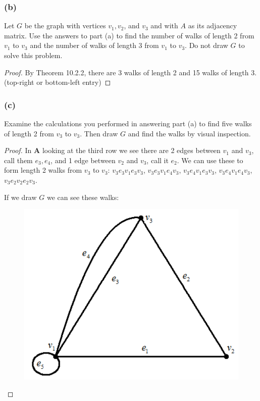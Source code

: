 \documentclass[14pt]{extarticle}
\begin{document}
\subsubsection{(b)}
Let \(G\) be the graph with vertices \(v_1, v_2\), and \(v_3\) and with \(A\) as its adjacency matrix. Use the answers to 
part (a) to find the number of walks of length 2 from \(v_1\) to \(v_3\) and the number of walks of length 3 from \(v_1\) to 
\(v_3\). Do not draw \(G\) to solve this problem.

\begin{proof}
By Theorem 10.2.2, there are 3 walks of length 2 and 15 walks of length 3. (top-right or bottom-left entry)
\end{proof}

\subsubsection{(c)}
Examine the calculations you performed in answering part (a) to find five walks of length 2 from \(v_3\) to \(v_3\). Then 
draw \(G\) and find the walks by visual inspection.

\begin{proof}
In {\bf A} looking at the third row we see there are 2 edges between \(v_1\) and \(v_3\), call them \(e_3, e_4\), and 1 
edge between \(v_2\) and \(v_3\), call it \(e_2\). We can use these to form length 2 walks from \(v_3\) to \(v_3\): 
\(v_3e_3v_1e_3v_3\), \(v_3e_3v_1e_4v_3\), \(v_3e_4v_1e_3v_3\), \(v_3e_4v_1e_4v_3\), \(v_3e_2v_2e_2v_3\).

If we draw \(G\) we can see these walks:

\begin{figure}[ht!]
\centering
\includegraphics[scale=0.2]{../images/10.2.19.c.png}
\end{figure}
\end{proof}
\end{document}
